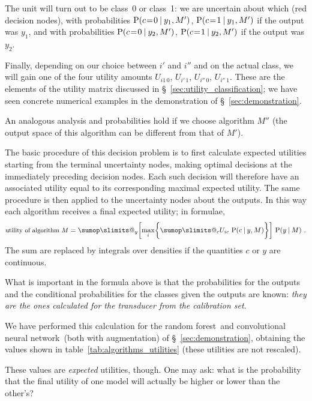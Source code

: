 \documentclass[\ifafour a4paper,12pt,\else a5paper,10pt,\fi%
onecolumn,oneside,article,%
british%
]{memoir}
\makeatletter
\theoremstyle{remark}
\theoremstyle{innote}
\def\sum{\DOTSI\sumop\slimits@}
\DeclarePairedDelimiter\set{\{}{\}} %
\renewcommand*{\P}{\mathrm{P}}%
\renewcommand*{\|}[1][]{\nonscript\:#1\vert\nonscript\:\mathopen{}}
\newcommand*{\mo}[1][=]{\mathrel{\mkern-3.5mu#1\mkern-3.5mu}}
\newcommand*{\sect}{\S}%
\newcommand*{\texts}[1]{\text{\small #1}}
\newcommand*{\RF}{random forest}
\newcommand*{\CNN}{convolutional neural network}
\makeatother
\begin{document}
The unit will turn out to be class~0 or class~1: we are uncertain about which (red decision nodes), with probabilities $\P(c\mo0 \| y_{1}, M')$, $\P(c\mo1 \| y_{1}, M')$ if the output was $y_{1}$, and with probabilities $\P(c\mo0 \| y_{2}, M')$, $\P(c\mo1 \| y_{2}, M')$ if the output was $y_{2}$.

Finally, depending on our choice between $i'$ and $i''$ and on the actual class, we will gain one of the four utility amounts $U_{i1\, 0}$, $U_{i'\, 1}$, $U_{i''\, 0}$, $U_{i''\, 1}$. These are the elements of the utility matrix discussed in \sect~\ref{sec:utility_classification}; we have seen concrete numerical examples in the demonstration of \sect~\ref{sec:demonstration}.

An analogous analysis and probabilities hold if we choose algorithm $M''$ (the output space of this algorithm can be different from that of $M'$).

The basic procedure of this decision problem is to first calculate expected utilities starting from the terminal uncertainty nodes, making optimal decisions at the immediately preceding decision nodes. Each such decision will therefore have an associated utility equal to its corresponding maximal expected utility. The same procedure is then applied to the uncertainty nodes about the outputs. In this way each algorithm receives a final expected utility; in formulae,
\begin{equation}
  \label{eq:algorithm_utility}
\texts{utility of algorithm $M$} =  \sum_{y} \biggl[\max_{i}\set[\bigg]{\sum_{c} U_{ic}\ \P(c \| y, M)}\biggr]\
  \P(y \| M) \ .
\end{equation}
The sum are replaced by integrals over densities if the quantities $c$ or $y$ are continuous.

What is important in the formula above is that the probabilities for the outputs and the conditional probabilities for the classes given the outputs are known: \emph{they are the ones calculated for the transducer from the calibration set}.

We have performed this calculation for the \RF\ and \CNN\ (both with augmentation) of \sect~\ref{sec:demonstration}, obtaining the values shown in table~\ref{tab:algorithms_utilities} (these utilities are not rescaled).


\medskip

These values are \emph{expected} utilities, though. One may ask: what is the probability that the final utility of one model will actually be higher or lower than the other's?
\end{document}
